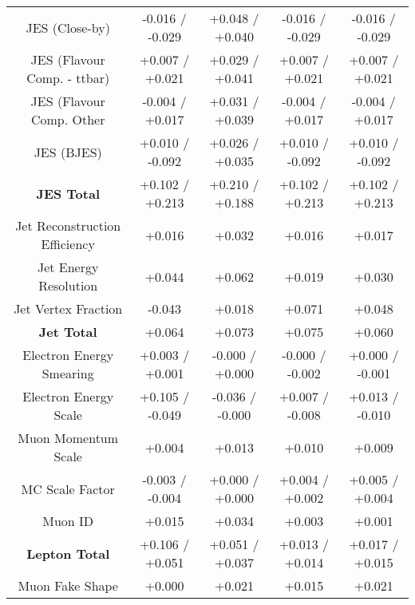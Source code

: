 \begin{table}[htbp]
\begin{center}
\begin{tabular}{|c|c|c|c|c|}
JES (Close-by)                        &-0.016   / -0.029   & +0.048   / +0.040   & -0.016   / -0.029   & -0.016   / -0.029  \\
JES (Flavour Comp. - ttbar)           &+0.007   / +0.021   & +0.029   / +0.041   & +0.007   / +0.021   & +0.007   / +0.021  \\
JES (Flavour Comp. Other              &-0.004   / +0.017   & +0.031   / +0.039   & -0.004   / +0.017   & -0.004   / +0.017  \\
JES (BJES)                            &+0.010   / -0.092   & +0.026   / +0.035   & +0.010   / -0.092   & +0.010   / -0.092  \\
\hline
\textbf{JES Total}                    &+0.102   / +0.213   & +0.210   / +0.188   & +0.102   / +0.213   & +0.102   / +0.213  \\
\hline
Jet Reconstruction Efficiency         &+0.016              & +0.032              & +0.016              & +0.017             \\
Jet Energy Resolution                 &+0.044              & +0.062              & +0.019              & +0.030             \\
Jet Vertex Fraction                   &-0.043              & +0.018              & +0.071              & +0.048             \\
\hline
\textbf{Jet Total}                    &+0.064              & +0.073              & +0.075              & +0.060             \\
\hline
Electron Energy Smearing              &+0.003   / +0.001   & -0.000   / +0.000   & -0.000   / -0.002   & +0.000   / -0.001  \\
Electron Energy Scale                 &+0.105   / -0.049   & -0.036   / -0.000   & +0.007   / -0.008   & +0.013   / -0.010  \\
Muon Momentum Scale                   &+0.004              & +0.013              & +0.010              & +0.009             \\
MC Scale Factor                       &-0.003   / -0.004   & +0.000   / +0.000   & +0.004   / +0.002   & +0.005   / +0.004  \\
Muon ID                               &+0.015              & +0.034              & +0.003              & +0.001             \\
\hline
\textbf{Lepton Total}                 &+0.106   / +0.051   & +0.051   / +0.037   & +0.013   / +0.014   & +0.017   / +0.015  \\
\hline
Muon Fake Shape                       &+0.000              & +0.021              & +0.015              & +0.021             \\

\end{tabular}
\end{center}
\end{table}
